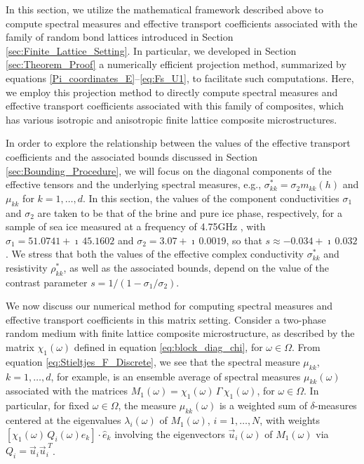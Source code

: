 \documentclass{cmslatex}
\begin{document}
In this section, we utilize the mathematical framework described above
to compute spectral measures and effective transport coefficients
associated with the family of random bond lattices introduced in
Section \ref{sec:Finite_Lattice_Setting}. In particular, 
we developed in Section \ref{sec:Theorem_Proof} a numerically
efficient projection method, summarized by equations
\eqref{Pi_coordinates_E}--\eqref{eq:Fs_U1}, to facilitate such 
computations. Here, we employ this projection method to directly
compute spectral measures and effective transport coefficients
associated with this family of composites, which has various isotropic
and anisotropic finite lattice composite microstructures.





In order to explore the relationship between the values of the
effective transport coefficients and the associated bounds discussed
in Section \ref{sec:Bounding_Procedure}, we will focus on the diagonal
components of the effective tensors and the underlying spectral
measures, e.g., $\sigma^*_{kk}=\sigma_2m_{kk}(h)$ and $\mu_{kk}$ for $k=1,\ldots,d$. In
this section, the values of the component conductivities $\sigma_1$ and
$\sigma_2$ are taken to be that of the brine and pure ice phase,
respectively, for a sample of sea ice measured at a frequency of
4.75GHz \cite{Backstrom:2007:Book}, with $\sigma_1=51.0741+\imath\,45.1602$ and
$\sigma_2=3.07+\imath\,0.0019$, so that $s\approx-0.034+\imath\,0.032$. We stress that both
the values of the effective complex conductivity $\sigma^*_{kk}$ and
resistivity $\rho^*_{kk}$, as well as the associated bounds, depend on the
value of the contrast parameter $s=1/(1-\sigma_1/\sigma_2)$. 



We now discuss our numerical method for computing spectral
measures and effective transport coefficients in this matrix setting. 
Consider a two-phase random medium with finite lattice composite
microstructure, as described by the matrix $\chi_1(\omega)$ defined in
equation \eqref{eq:block_diag_chi}, for $\omega\in\Omega$. From
equation \eqref{eq:Stieltjes_F_Discrete}, we see that the spectral
measure $\mu_{kk}$, $k=1,\ldots,d$, for example, is an ensemble average of
spectral measures $\mu_{kk}(\omega)$ associated with the matrices
$M_1(\omega)=\chi_1(\omega)\,\Gamma\,\chi_1(\omega)$, for $\omega\in\Omega$. In particular, for fixed $\omega\in\Omega$,
the measure  $\mu_{kk}(\omega)$ is a weighted sum of $\delta$-measures centered at
the eigenvalues $\lambda_i(\omega)$ of $M_1(\omega)$, $i=1,\ldots,N$, with weights
$[\chi_1(\omega)\,Q_i(\omega)\hat{e}_k]\cdot\hat{e}_k$ involving the eigenvectors 
$\vec{u}_i(\omega)$ of $M_1(\omega)$ via $Q_i=\vec{u}_i\vec{u}_i^{\;T}$.
\end{document}
